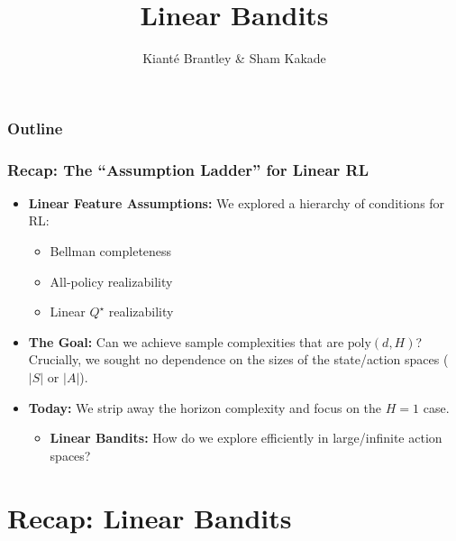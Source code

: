 \documentclass[aspectratio=169]{beamer}
\title[LinUCB]{Linear Bandits}
\author[Sham \& Kiant\'{e}]{Kiant\'{e} Brantley \& Sham Kakade}
\date{}
\begin{document}
\begin{frame}
\titlepage  
\end{frame}

\begin{frame}[noframenumbering]
  \frametitle{Outline}
  \tableofcontents
\end{frame}



\begin{frame}\frametitle{Recap: The ``Assumption Ladder'' for Linear RL}

\begin{itemize}
\item \textbf{Linear Feature Assumptions:} We explored a hierarchy of conditions for RL:
  \begin{itemize}
    \item Bellman completeness
    \item All-policy realizability
    \item Linear $Q^\star$ realizability
  \end{itemize}
  
\vspace{0.4cm}
\item \textbf{The Goal:} Can we achieve sample complexities that are $\text{poly}(d, H)$?\\
\alert{Crucially,} we sought no dependence on the sizes of the state/action spaces ($|S|$ or $|A|$).


\vspace{0.4cm}
\item \textbf{Today:} We strip away the horizon complexity and focus on the $H=1$ case. 
  \begin{itemize}
    \item \textbf{Linear Bandits:} How do we explore efficiently in large/infinite action spaces?
  \end{itemize}
\end{itemize}

\end{frame}


\section{Recap: Linear Bandits}

\end{document}
